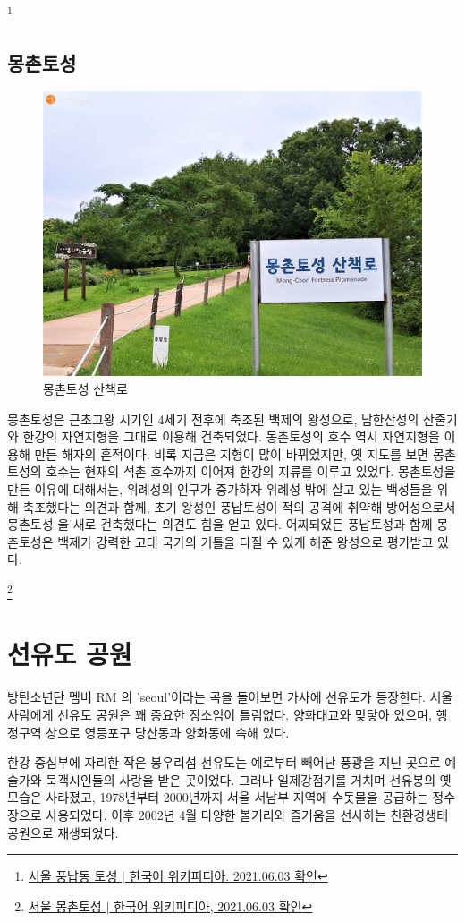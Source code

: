 \footnote{\href{https://ko.wikipedia.org/wiki/서울_풍납동_토성}{서울 풍납동 토성 $|$ 한국어 위키피디아. 2021.06.03 확인}}


\subsection{몽촌토성}

\begin{figure}
    \centering
    \includegraphics[width=.6\textwidth]{e_img/ww_-005.jpg}
    \caption{몽촌토성 산책로}
    \label{fig:haryu6}
\end{figure}


몽촌토성은 근초고왕 시기인 4세기 전후에 축조된 백제의 왕성으로, 남한산성의 
산줄기와 한강의 자연지형을 그대로 이용해 건축되었다. 몽촌토성의 호수 역시 자연지형을
이용해 만든 해자의 흔적이다. 비록 지금은 지형이 많이 바뀌었지만, 옛 지도를 보면 
몽촌토성의 호수는 현재의 석촌 호수까지 이어져 한강의 지류를 이루고 있었다. 몽촌토성을 
만든 이유에 대해서는, 위례성의 인구가 증가하자 위례성 밖에 살고 있는 백성들을 위해 
축조했다는 의견과 함께, 초기 왕성인 풍납토성이 적의 공격에 취약해 방어성으로서 몽촌토성
을 새로 건축했다는 의견도 힘을 얻고 있다. 어찌되었든 풍납토성과 함께 몽촌토성은 
백제가 강력한 고대 국가의 기틀을 다질 수 있게 해준 왕성으로 평가받고 있다.

\footnote {\href{https://ko.wikipedia.org/wiki/서울_몽촌토성}{서울 몽촌토성 $|$ 한국어 위키피디아, 2021.06.03 확인}}

\section{선유도 공원}
방탄소년단 멤버 RM 의 'seoul'이라는 곡을 들어보면 가사에 선유도가 등장한다. 서울
사람에게 선유도 공원은 꽤 중요한 장소임이 틀림없다. 양화대교와 맞닿아 있으며, 
행정구역 상으로 영등포구 당산동과 양화동에 속해 있다.

한강 중심부에 자리한 작은 봉우리섬 선유도는 예로부터 빼어난 풍광을 지닌 곳으로
예술가와 묵객시인들의 사랑을 받은 곳이었다. 그러나 일제강점기를 거치며 선유봉의 옛
모습은 사라졌고, 1978년부터 2000년까지 서울 서남부 지역에 수돗물을 공급하는 
정수장으로 사용되었다. 이후 2002년 4월 다양한 볼거리와 즐거움을 선사하는 
친환경생태공원으로 재생되었다.


